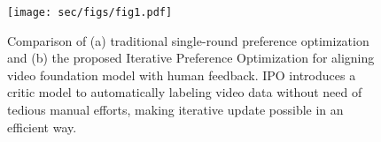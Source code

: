 \begin{figure}[t]
    \centering
    \texttt{[image: sec/figs/fig1.pdf]}
    \vspace{-0.2cm}
    \caption{Comparison of (a) traditional single-round preference optimization and (b) the proposed Iterative Preference Optimization for aligning video foundation model with human feedback. IPO introduces a critic model to automatically labeling video data without need of tedious manual efforts, making iterative update possible in an efficient way. 
    }
    \label{fig:intro}
    \vspace{-0.5cm}
\end{figure}